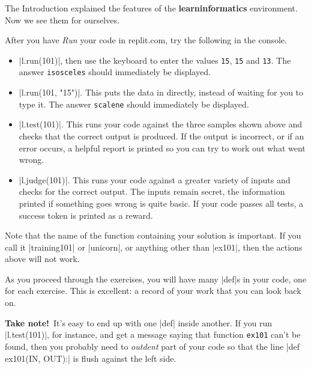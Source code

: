 \Running

The Introduction explained the features of the \textbf{learninformatics} environment. Now
we see them for ourselves.

After you have \emph{Run} your code in replit.com, try the following in the console.
\begin{itemize}
  \item \pycode|l.run(101)|, then use the keyboard to enter the values \texttt{15},
    \texttt{15} and \texttt{13}. The answer \texttt{isosceles} should immediately be
    displayed.
  \item \pycode|l.run(101, "15\n")|. This puts the data in directly, instead of
    waiting for you to type it. The answer \texttt{scalene} should immediately be
    displayed.
  \item \pycode|l.test(101)|. This runs your code against the three samples shown
    above and checks that the correct output is produced. If the output is incorrect, or
    if an error occurs, a helpful report is printed so you can try to work out what went
    wrong.
  \item \pycode|l.judge(101)|. This runs your code against a greater variety of inputs and
    checks for the correct output. The inputs remain secret, the information printed if
    something goes wrong is quite basic. If your code passes all tests, a success token is
    printed as a reward.
\end{itemize}

Note that the name of the function containing your solution is important. If you call it
\pycode|training101| or \pycode|unicorn|, or anything other than \pycode|ex101|, then the
actions above will not work.

\begin{tcolorbox}
  As you proceed through the exercises, you will have many \pycode|def|s in your code, one
  for each exercise. This is excellent: a record of your work that you can look back on.

  \vspace{12pt}
  \textbf{Take note!}\quad\ It's easy to end up with one \pycode|def| inside another. If you run
  \pycode|l.test(101)|, for instance, and get a message saying that function
  \texttt{ex101} can't be found, then you probably need to \emph{outdent} part of your
  code so that the line \pycode|def ex101(IN, OUT):| is flush against the left side.
\end{tcolorbox}



